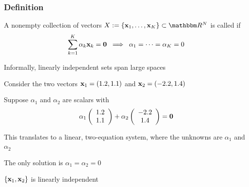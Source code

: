 \begin{frame}

    \vspace{2em}
    \frametitle{Definition}

    A nonempty collection of vectors $X := \{\boldx_1,\ldots, \boldx_K\}
    \subset \RR^N$ is called  if
    \begin{equation*}
        \sum_{k=1}^K \alpha_k {\mathbf x}_k
         = {\mathbf 0} 
        \; \implies \;
        \alpha_1 = \cdots = \alpha_K = 0
    \end{equation*}

    \vspace{1em}
    
    Informally, linearly independent sets span large spaces

\end{frame}


\begin{frame}
    
    \vspace{2em}
    \Eg 
    Consider the two vectors ${\mathbf x}_1 = (1.2, 1.1)$ and ${\mathbf x}_2 = (-2.2, 1.4)$
    
    Suppose $\alpha_1$ and $\alpha_2$ are scalars with
    \begin{equation*}
        \alpha_1
        \left(
        \begin{array}{c}
            1.2 \\
            1.1
        \end{array}
        \right)
        + 
        \alpha_2
        \left(
        \begin{array}{c}
            -2.2 \\
            1.4
        \end{array}
        \right)
        =
        {\mathbf 0}
    \end{equation*}
    
    This translates to a linear, two-equation system, where the unknowns
    are $\alpha_1$ and $\alpha_2$ 
    
    The only solution is $\alpha_1 = \alpha_2 = 0$
    
    $\{{\mathbf x}_1, {\mathbf x}_2\}$ is linearly independent


\end{frame}

